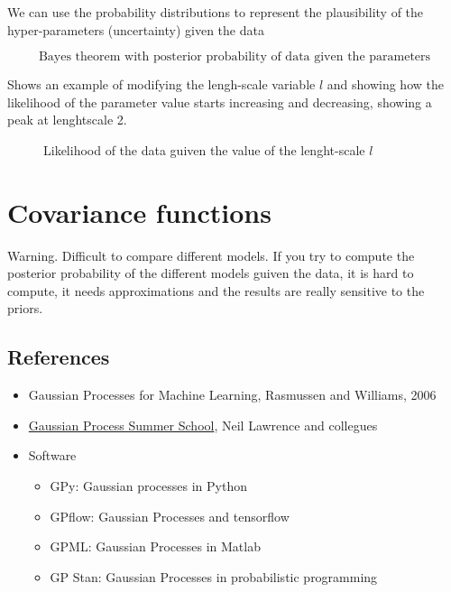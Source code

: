 \documentclass[b5paper]{report}
\begin{document}
We can use the probability distributions to represent the plausibility of the
hyper-parameters (uncertainty) given the data

\begin{equation}
  \text{Bayes theorem with posterior probability of data given the parameters}
\end{equation}

Shows an example of modifying the lengh-scale variable $l$ and showing how the
likelihood of the parameter value starts increasing and decreasing, showing a
peak at lenghtscale 2.

\newcommand\gauss[2]{1/(#2*sqrt(2*pi))*exp(-((x-#1)^2)/(2*#2^2))} %

\begin{figure}[h]
  \centering
  \caption{Likelihood of the data guiven the value of the lenght-scale $l$}
\end{figure}

\section{Covariance functions}

Warning. Difficult to compare different models. If you try to compute the posterior
probability of the different models guiven the data, it is hard to compute, it
needs approximations and the results are really sensitive to the priors.


\subsection{References}

\begin{itemize}
  \item Gaussian Processes for Machine Learning, Rasmussen and Williams, 2006
  \item \href{http://gpss.cc/}{Gaussian Process Summer School}, Neil Lawrence and collegues
    \item Software
      \begin{itemize}
        \item GPy: Gaussian processes in Python
        \item GPflow: Gaussian Processes and tensorflow
        \item GPML: Gaussian Processes in Matlab
        \item GP Stan: Gaussian Processes in probabilistic programming
      \end{itemize}
\end{itemize}
\end{document}
